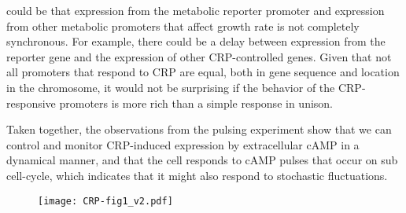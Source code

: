could be that
expression from the metabolic reporter promoter and
expression from other metabolic promoters that affect growth rate is not completely synchronous.
%
For example, there could be a delay between expression from the reporter gene and the expression of other CRP-controlled genes.
%
Given that not all promoters that respond to CRP are equal, both in gene sequence and location in the chromosome,
it would not be surprising if the behavior of the CRP-responsive promoters is more rich
than a simple response in unison.



Taken together, %
the observations from the pulsing experiment show that we can control and monitor CRP-induced expression by extracellular cAMP in a dynamical manner,
and that the cell responds to cAMP pulses that occur on sub cell-cycle, which indicates that it might also respond to stochastic fluctuations.


%
%



\begin{figure}
	\centering
	\texttt{[image: CRP-fig1\_v2.pdf]}
	\clearpage %
\end{figure}	

\clearpage

